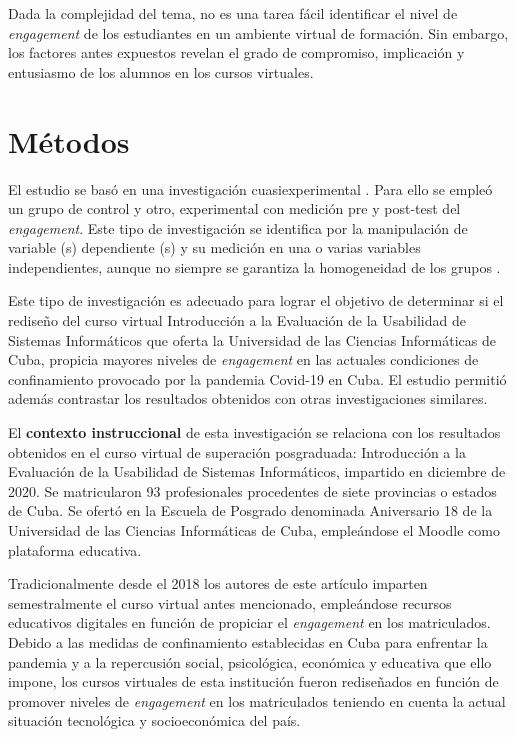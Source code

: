 \documentclass[spanish]{textolivre}
\begin{document}
Dada la complejidad del tema, no es una tarea fácil identificar el nivel de \emph{engagement} de los estudiantes en un ambiente virtual de formación. Sin embargo, los factores antes expuestos revelan el grado de compromiso, implicación y entusiasmo de los alumnos en los cursos virtuales.

\section{Métodos}
El estudio se basó en una investigación cuasiexperimental \cite{gopalan2020}. %
Para ello se empleó un grupo de control y otro, experimental con medición pre y post-test del \emph{engagement}. Este tipo de investigación \cite{pulidoguerrero2020} %
se identifica por la manipulación de variable (s) dependiente (s) y su medición en una o varias variables independientes, aunque no siempre se garantiza la homogeneidad de los grupos \cite{hernandezsampieri2014}. %

Este tipo de investigación es adecuado para lograr el objetivo de determinar si el rediseño del curso virtual Introducción a la Evaluación de la Usabilidad de Sistemas Informáticos que oferta la Universidad de las Ciencias Informáticas de Cuba, propicia mayores niveles de \emph{engagement} en las actuales condiciones de confinamiento provocado por la pandemia Covid-19 en Cuba. El estudio permitió además contrastar los resultados obtenidos con otras investigaciones similares.

El \textbf{contexto instruccional} de esta investigación se relaciona con los resultados obtenidos en el curso virtual de superación posgraduada: Introducción a la Evaluación de la Usabilidad de Sistemas Informáticos, impartido en diciembre de 2020. Se matricularon 93 profesionales procedentes de siete provincias o estados de Cuba. Se ofertó en la Escuela de Posgrado denominada Aniversario 18 de la Universidad de las Ciencias Informáticas de Cuba, empleándose el Moodle como plataforma educativa.

Tradicionalmente desde el 2018 los autores de este artículo imparten semestralmente el curso virtual antes mencionado, empleándose recursos educativos digitales en función de propiciar el \emph{engagement} en los matriculados. Debido a las medidas de confinamiento establecidas en Cuba para enfrentar la pandemia y a la repercusión social, psicológica, económica y educativa que ello impone, los cursos virtuales de esta institución fueron rediseñados en función de promover niveles de \emph{engagement} en los matriculados teniendo en cuenta la actual situación tecnológica y socioeconómica del país.
\end{document}
